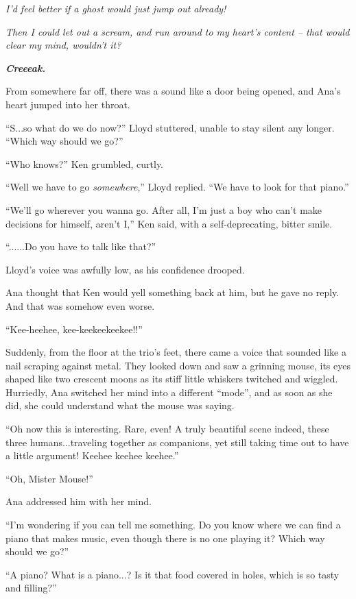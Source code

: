\documentclass[
]{article}
\begin{document}
\emph{I'd feel better if a ghost would just jump out already!}

\emph{Then I could let out a scream, and run around to my heart's
content -- that would clear my mind, wouldn't it?}

\emph{\textbf{Creeeak.}}

\textbf{}From somewhere far off, there was a sound like a door being
opened, and Ana's heart jumped into her throat.

``S...so what do we do now?'' Lloyd stuttered, unable to stay silent any
longer. ``Which way should we go?''

``Who knows?'' Ken grumbled, curtly.

``Well we have to go \emph{somewhere},'' Lloyd replied. ``We have to
look for that piano.''

``We'll go wherever you wanna go. After all, I'm just a boy who can't
make decisions for himself, aren't I,'' Ken said, with a
self-deprecating, bitter smile.

``......Do you have to talk like that?''

Lloyd's voice was awfully low, as his confidence drooped.

Ana thought that Ken would yell something back at him, but he gave no
reply. And that was somehow even worse.

``Kee-heehee, kee-keekeekeekee!!''

Suddenly, from the floor at the trio's feet, there came a voice that
sounded like a nail scraping against metal. They looked down and saw a
grinning mouse, its eyes shaped like two crescent moons as its stiff
little whiskers twitched and wiggled. Hurriedly, Ana switched her mind
into a different ``mode'', and as soon as she did, she could understand
what the mouse was saying.

``Oh now this is interesting. Rare, even! A truly beautiful scene
indeed, these three humans...traveling together as companions, yet still
taking time out to have a little argument! Keehee keehee keehee.''

``Oh, Mister Mouse!''

Ana addressed him with her mind.

``I'm wondering if you can tell me something. Do you know where we can
find a piano that makes music, even though there is no one playing it?
Which way should we go?''

``A piano? What is a piano...? Is it that food covered in holes, which
is so tasty and filling?''
\end{document}

